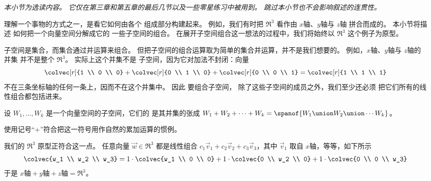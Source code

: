 \textit{本小节为选读内容。
它仅在第三章和第五章的最后几节以及一些零星练习中被用到。
跳过本小节也不会影响叙述的连贯性。}


理解一个事物的方式之一，是看它如何由各个
组成部分构建起来。
例如，我们有时把 \( \Re^3 \)
看作由 \( x \)轴、\( y \)轴与 \( z \)轴
拼合而成的。
本小节将描述
如何把一个向量空间分解成它的
一些子空间的组合。
在展开子空间组合这一想法的过程中，我们将始终以 $\Re^3$
这个例子为原型。

子空间是集合，而集合通过并运算来组合。
但把子空间的组合运算取为简单的集合并运算，并不是我们想要的。
例如，\( x \)轴、\( y \)轴与 \( z \)轴的并集
并不是整个 $\Re^3$。
实际上这个并集不是
子空间，因为它对加法不封闭：向量
\begin{equation*}
  \colvec[r]{1 \\ 0 \\ 0}
  +
  \colvec[r]{0 \\ 1 \\ 0}
  +
  \colvec[r]{0 \\ 0 \\ 1}
  =
  \colvec[r]{1 \\ 1 \\ 1}
\end{equation*}
不在三条坐标轴的任何一条上，因而不在这个并集中。
因此
要组合子空间，
除了这些子空间的成员之外，我们至少还必须
把它们所有的线性组合都包括进来。

\begin{definition}
设 \( W_1,\dots, W_k \) 是一个向量空间的子空间，它们的
是其并集的张成
$W_1+W_2+\dots +W_k=\spanof{W_1\union W_2\union \cdots W_k}$。
\end{definition}

\noindent 使用记号“\( + \)”符合把这一符号用作自然的累加运算的惯例。

\begin{example} \label{ex:RThreeSumAxes}
我们的 $\Re^3$ 原型正符合这一点。
任意向量 $\vec{w}\in\Re^3$ 都是线性组合
$c_1\vec{v}_1+c_2\vec{v}_2+c_3\vec{v}_3$，其中 $\vec{v}_1$ 取自
$x$轴，等等，如下所示
\begin{equation*}
    \colvec{w_1 \\ w_2 \\ w_3}
    =1\cdot\colvec{w_1 \\ 0 \\ 0}
    +1\cdot\colvec{0 \\ w_2 \\ 0}
    +1\cdot\colvec{0 \\ 0 \\ w_3}
\end{equation*}
于是 $\text{$x$轴}+\text{$y$轴}+\text{$z$轴}=\Re^3$。
\end{example}

